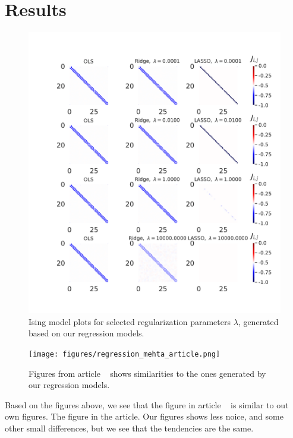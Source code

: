 \section{Results}
\begin{figure}[H]
\includegraphics[width = 0.7\paperwidth]{figures/regression_mehtastyle.pdf} 
\caption{Ising model plots for selected regularization parameters $\lambda$, generated based on our regression models.
	 } 
\label{fig:regression-mehta}
\end{figure}

\begin{figure}[H]
\texttt{[image: figures/regression\_mehta\_article.png]} 
\caption{Figures from article ~\cite{HighBias} shows similarities to the ones generated by our regression models.} 
\label{fig:regression-mehta}
\end{figure}

Based on the figures above, we see that the figure in article ~\cite{HighBias} 
is similar to out own figures. The figure in the article. Our figures
shows less noice, and some other small differences,  but we see that the tendencies are the same. 

